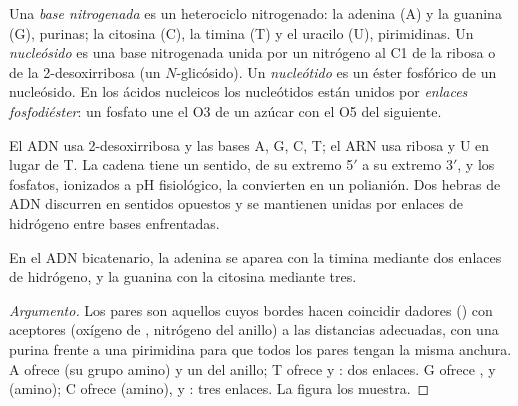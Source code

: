 \begin{definition}[Nucleótidos]\label{def:b2:biomolecules:nucleotide}
Una \emph{base nitrogenada} es un heterociclo nitrogenado: la adenina (A) y la guanina (G), purinas;
la citosina (C), la timina (T) y el uracilo (U), pirimidinas. Un \emph{nucleósido} es una
base nitrogenada unida por un nitrógeno al C1 de la ribosa o de la 2-desoxirribosa (un $N$-glicósido). Un
\emph{nucleótido} es un éster fosfórico de un nucleósido. En los ácidos nucleicos los
nucleótidos están unidos por \emph{enlaces fosfodiéster}: un fosfato une
el O3 de un azúcar con el O5 del siguiente.
\end{definition}

El ADN usa 2-desoxirribosa y las bases A, G, C, T; el ARN usa ribosa y U en lugar de T. La cadena tiene un
sentido, de su extremo 5$'$ a su extremo 3$'$, y los fosfatos, ionizados a pH fisiológico, la convierten en un
polianión. Dos hebras de ADN discurren en sentidos opuestos y se mantienen unidas por enlaces de hidrógeno entre
bases enfrentadas.

\begin{proposition}\label{prop:b2:biomolecules:pairing}
En el ADN bicatenario, la adenina se aparea con la timina mediante dos enlaces de hidrógeno, y la guanina con la citosina
mediante tres.
\end{proposition}

\begin{proof}[Argumento]
Los pares son aquellos cuyos bordes hacen coincidir dadores () con aceptores (oxígeno de , nitrógeno
del anillo) a las distancias adecuadas, con una purina frente a una pirimidina para que todos los pares tengan la misma
anchura. A ofrece  (su grupo amino) y un  del anillo; T ofrece  y : dos enlaces. G
ofrece ,  y  (amino); C ofrece  (amino),  y : tres
enlaces. La figura los muestra.
\end{proof}

